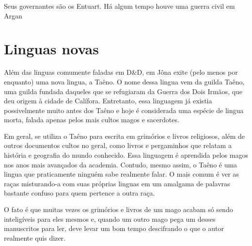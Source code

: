 \documentclass{RPG_Adventure}[2021/10/20]
\begin{document}
\begin{multicols}{2}
Seus governantes são os Entuart. Há algum tempo houve uma guerra civil em Argan

\section{Linguas novas}%

Além das linguas comumente faladas em D&D, em Jôna exite (pelo menos por
enquanto) uma nova lingua, a Taêno. O nome dessa lingua vem da guilda Taêno, uma
guilda fundada daqueles que se refugiaram da Guerra dos Dois Irmãos, que deu
origem à cidade de Calífora. Entretanto, essa linguagem já existia possivelmente
muito antes dos Taêno e hoje é considerada uma espécie de lingua morta, falada
apenas pelos mais cultos magos e sacerdotes.

Em geral, se utiliza o Taêno para escrita em grimórios e livros religiosos, além
de outros documentos cultos no geral, como livros e pergaminhos que relatam a
história e geografia do mundo conhecido. Essa linguagem é aprendida pelos magos
nos anos mais avançados da academia. Contudo, mesmo assim, o Taêno é uma lingua
que praticamente ninguém sabe realmente falar. O mais comum é ver as raças
misturando-a com suas próprias linguas em um amalgama de palavras bastante
confuso para quem pertence a outra raça.

O fato é que muitas vezes os grimórios e livros de um mago acabam só sendo
inteligíveis para eles mesmos e, quando um outro mago pega um desses manuscritos
para ler, deve levar um bom tempo descifrando o que o autor realmente quis
dizer.

\end{multicols}

\end{document}
